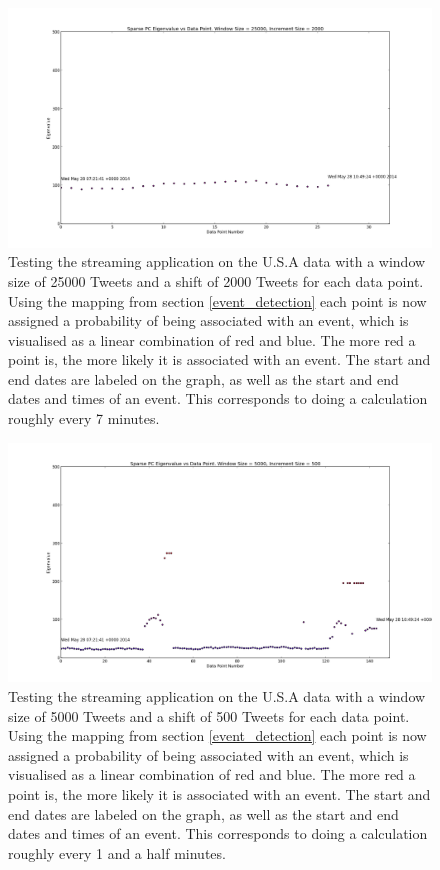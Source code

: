 \documentclass[11pt,a4paper]{article}
\begin{document}
\begin{figure}[H]
\centering
\includegraphics[scale=0.25]{Testing_Streaming_App_25000_2000_USA.png}
\caption{Testing the streaming application on the U.S.A data with a window size of 25000 Tweets and a shift of 2000 Tweets for each data point. Using the mapping from section \ref{event_detection} each point is now assigned a probability of being associated with an event, which is visualised as a linear combination of red and blue. The more red a point is, the more likely it is associated with an event. The start and end dates are labeled on the graph, as well as the start and end dates and times of an event. This corresponds to doing a calculation roughly every 7 minutes.}
\label{testing_app_25000_usa}
\end{figure}

\begin{figure}[H]
\centering
\includegraphics[scale=0.25]{Testing_Streaming_App_5000_500_USA.png}
\caption{Testing the streaming application on the U.S.A data with a window size of 5000 Tweets and a shift of 500 Tweets for each data point. Using the mapping from section \ref{event_detection} each point is now assigned a probability of being associated with an event, which is visualised as a linear combination of red and blue. The more red a point is, the more likely it is associated with an event. The start and end dates are labeled on the graph, as well as the start and end dates and times of an event. This corresponds to doing a calculation roughly every 1 and a half minutes.}
\label{testing_app_5000_usa}
\end{figure}
\end{document}
